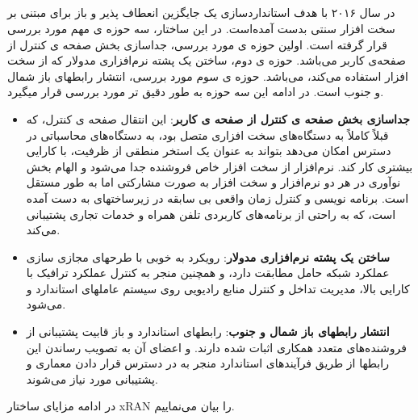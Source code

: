 \subsection{}
در سال ۲۰۱۶ با هدف استانداردسازی یک جایگزین انعطاف پذیر و باز برای 
مبتنی بر سخت افزار سنتی بدست آمده‌است.
 در این ساختار، سه حوزه ی مهم مورد بررسی قرار گرفته است.
اولین حوزه ی مورد بررسی، جداسازی بخش
صفحه ی کنترل
  از 
 صفحه‌ی کاربر
می‌باشد. حوزه ی دوم،
ساختن یک پشته نرم‌افزاری  مدولار که از سخت افزار  استفاده می‌کند، می‌باشد.
حوزه ی سوم مورد بررسی، انتشار رابطهای باز شمال و جنوب است\cite{xran}.
در ادامه این سه حوزه به طور دقیق تر مورد بررسی قرار میگیرد\cite{xran1}.

\begin{itemize}
\item \textbf{ جداسازی بخش صفحه ی کنترل از 
صفحه ی کاربر}:
این انتقال صفحه ی کنترل، که قبلاً کاملاً به دستگاه‌های سخت افزاری  متصل بود، به دستگاه‌های محاسباتی در دسترس امکان می‌دهد  بتواند به عنوان یک استخر منطقی از ظرفیت، با کارایی بیشتری کار کند.
نرم‌افزار  از سخت افزار خاص فروشنده جدا می‌شود و الهام بخش نوآوری در هر دو نرم‌افزار و سخت افزار به صورت مشارکتی اما به طور مستقل است.
برنامه نویسی و کنترل زمان واقعی بی سابقه در زیرساختهای  به دست آمده است، که به راحتی از برنامه‌های کاربردی تلفن همراه و خدمات تجاری پشتیبانی می‌کند.
\item \textbf{ساختن یک پشته نرم‌افزاری  مدولار}:
رویکرد  به خوبی با طرحهای مجازی سازی عملکرد شبکه حامل  مطابقت دارد، و همچنین منجر به کنترل عملکرد ترافیک با کارایی بالا، مدیریت تداخل و کنترل منابع رادیویی روی سیستم عاملهای استاندارد  و می‌شود.
\item \textbf{انتشار رابطهای باز شمال و جنوب}: 
رابطهای استاندارد و باز قابیت پشتیبانی از فروشنده‌های متعدد همکاری اثبات شده دارند. 
و اعضای آن به تصویب رساندن این رابطها از طریق فرآیندهای استاندارد منجر به در دسترس قرار دادن معماری  و پشتیبانی مورد نیاز می‌شوند.

\end{itemize}
در ادامه مزایای ساختار xRAN را بیان می‌نماییم.

